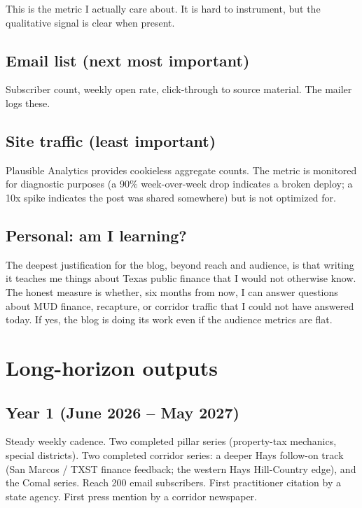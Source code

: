 \documentclass[11pt]{article}
\begin{document}
This is the metric I actually care about. It is hard to
instrument, but the qualitative signal is clear when present.

\subsection{Email list (next most important)}

Subscriber count, weekly open rate, click-through to source
material. The mailer logs these.

\subsection{Site traffic (least important)}

Plausible Analytics provides cookieless aggregate counts. The
metric is monitored for diagnostic purposes (a 90\% week-over-week
drop indicates a broken deploy; a 10x spike indicates the post
was shared somewhere) but is not optimized for.

\subsection{Personal: am I learning?}

The deepest justification for the blog, beyond reach and audience,
is that writing it teaches me things about Texas public finance
that I would not otherwise know. The honest measure is whether,
six months from now, I can answer questions about MUD finance,
recapture, or corridor traffic that I could not have answered
today. If yes, the blog is doing its work even if the audience
metrics are flat.

\section{Long-horizon outputs}

\subsection{Year 1 (June 2026 -- May 2027)}

Steady weekly cadence. Two completed pillar series
(property-tax mechanics, special districts). Two completed
corridor series: a deeper Hays follow-on track (San Marcos /
TXST finance feedback; the western Hays Hill-Country edge), and
the Comal series. Reach 200 email subscribers.
First practitioner citation by a state agency. First press
mention by a corridor newspaper.
\end{document}
